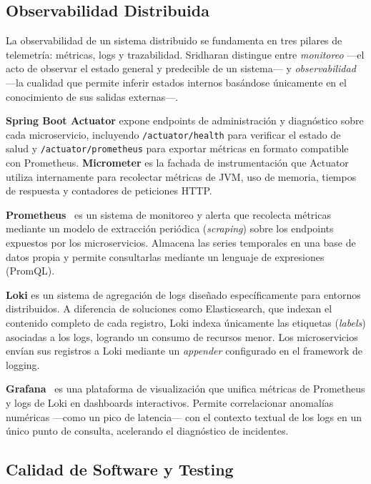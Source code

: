 \subsection{Observabilidad Distribuida}
\label{sec:observabilidad-distribuida}

La observabilidad de un sistema distribuido se fundamenta en tres pilares de telemetr\'{i}a: m\'{e}tricas, logs y trazabilidad. Sridharan \cite{sridharan2018distributed} distingue entre \textit{monitoreo} ---el acto de observar el estado general y predecible de un sistema--- y \textit{observabilidad} ---la cualidad que permite inferir estados internos bas\'{a}ndose \'{u}nicamente en el conocimiento de sus salidas externas---.

\textbf{Spring Boot Actuator} expone endpoints de administraci\'{o}n y diagn\'{o}stico sobre cada microservicio, incluyendo \texttt{/actuator/health} para verificar el estado de salud y \texttt{/actuator/prometheus} para exportar m\'{e}tricas en formato compatible con Prometheus. \textbf{Micrometer} es la fachada de instrumentaci\'{o}n que Actuator utiliza internamente para recolectar m\'{e}tricas de JVM, uso de memoria, tiempos de respuesta y contadores de peticiones HTTP.

\textbf{Prometheus}~\cite{prometheus2024} es un sistema de monitoreo y alerta que recolecta m\'{e}tricas mediante un modelo de extracci\'{o}n peri\'{o}dica (\textit{scraping}) sobre los endpoints expuestos por los microservicios. Almacena las series temporales en una base de datos propia y permite consultarlas mediante un lenguaje de expresiones (PromQL).

\textbf{Loki} es un sistema de agregaci\'{o}n de logs dise\~{n}ado espec\'{i}ficamente para entornos distribuidos. A diferencia de soluciones como Elasticsearch, que indexan el contenido completo de cada registro, Loki indexa \'{u}nicamente las etiquetas (\textit{labels}) asociadas a los logs, logrando un consumo de recursos menor. Los microservicios env\'{i}an sus registros a Loki mediante un \textit{appender} configurado en el framework de logging.

\textbf{Grafana}~\cite{grafana2024} es una plataforma de visualizaci\'{o}n que unifica m\'{e}tricas de Prometheus y logs de Loki en dashboards interactivos. Permite correlacionar anomal\'{i}as num\'{e}ricas ---como un pico de latencia--- con el contexto textual de los logs en un \'{u}nico punto de consulta, acelerando el diagn\'{o}stico de incidentes.

\subsection{Calidad de Software y Testing}

